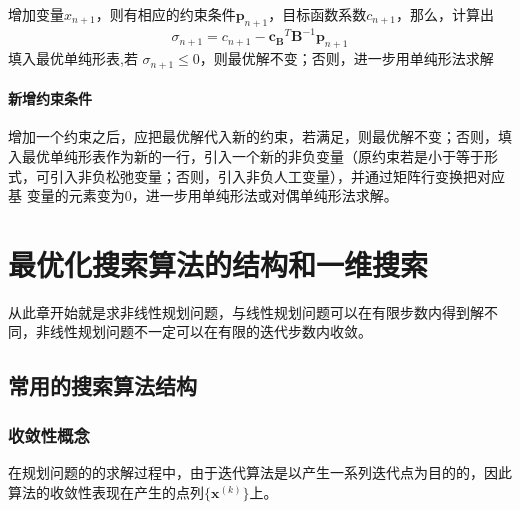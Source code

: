 \documentclass{book}
\begin{document}
增加变量$x_{n+1}$，则有相应的约束条件$\boldsymbol{p}_{n+1}$，目标函数系数$c_{n+1}$，那么，计算出$$\sigma_{n+1}=c_{n+1}-\boldsymbol{c_B}^T\boldsymbol{B}^{-1}\boldsymbol{p}_{n+1}$$
填入最优单纯形表,若 $\sigma_{n+1} \le 0$，则最优解不变；否则，进一步用单纯形法求解

\subsubsection{新增约束条件}

增加一个约束之后，应把最优解代入新的约束，若满足，则最优解不变；否则，填入最优单纯形表作为新的一行，引入一个新的非负变量（原约束若是小于等于形
式，可引入非负松弛变量；否则，引入非负人工变量），并通过矩阵行变换把对应基
变量的元素变为0，进一步用单纯形法或对偶单纯形法求解。

\chapter{最优化搜索算法的结构和一维搜索}

从此章开始就是求非线性规划问题，与线性规划问题可以在有限步数内得到解不同，非线性规划问题不一定可以在有限的迭代步数内收敛。

\section{常用的搜索算法结构}

\subsection{收敛性概念}

在规划问题的的求解过程中，由于迭代算法是以产生一系列迭代点为目的的，因此算法的收敛性表现在产生的点列$ \{ \boldsymbol{x}^{(k)} \} $上。
\end{document}
